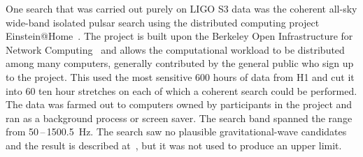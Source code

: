 One search that was carried out purely on LIGO S3 data was the coherent all-sky wide-band isolated pulsar 
search using the distributed computing project Einstein@Home~\cite{eath}. The project is built upon the 
Berkeley Open Infrastructure for Network Computing~\cite{BOINC} and allows the computational workload to be 
distributed among many computers, generally contributed by the general public who sign up to the project. 
This used the most sensitive 600 hours of data from H1 and cut it into 60 ten hour stretches on each of which
a coherent search could be performed. The data was farmed out to computers owned by participants in the 
project and ran as a background process or screen saver. The search band spanned the range from 
50\,--\,1500.5~Hz. The search saw no plausible gravitational-wave candidates and the result is described
at~\cite{eathS3}, but it was not used to produce an upper limit.

